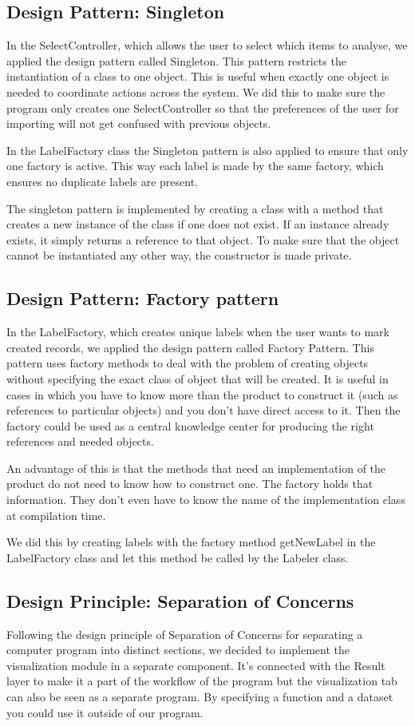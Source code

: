 \documentclass[a4paper,english,fleqn]{exam}
\begin{document}
\subsection{Design Pattern: Singleton}
In the SelectController, which allows the user to select which items to analyse, we applied the design pattern called Singleton. This pattern restricts the instantiation of a class to one object. This is useful when exactly one object is needed to coordinate actions across the system. We did this to make sure the program only creates one SelectController so that the preferences of the user for importing will not get confused with previous objects.
 
In the LabelFactory class the Singleton pattern is also applied to ensure that only one factory is active. This way each label is made by the same factory, which ensures no duplicate labels are present.
 
The singleton pattern is implemented by creating a class with a method that creates a new instance of the class if one does not exist. If an instance already exists, it simply returns a reference to that object. To make sure that the object cannot be instantiated any other way, the constructor is made private.

\subsection{Design Pattern: Factory pattern}
In the LabelFactory, which creates unique labels when the user wants to mark created records, we applied the design pattern called Factory Pattern. This pattern uses factory methods to deal with the problem of creating objects without specifying the exact class of object that will be created. It is useful in cases in which you have to know more than the product to construct it (such as references to particular objects) and you don't have direct access to it. Then the factory could be used as a central knowledge center for producing the right references and needed objects.
 
An advantage of this is that the methods that need an implementation of the product do not need to know how to construct one. The factory holds that information. They don't even have to know the name of the implementation class at compilation time.
 
We did this by creating labels with the factory method getNewLabel in the LabelFactory class and let this method be called by the Labeler class.
 

\subsection{Design Principle: Separation of Concerns}
Following the design principle of Separation of Concerns for separating a computer program into distinct sections, we decided to implement the visualization module in a separate component. It's connected with the Result layer to make it a part of the workflow of the program but the visualization tab can also be seen as a separate program. By specifying a function and a dataset you could use it outside of our program.
 
\end{document}
